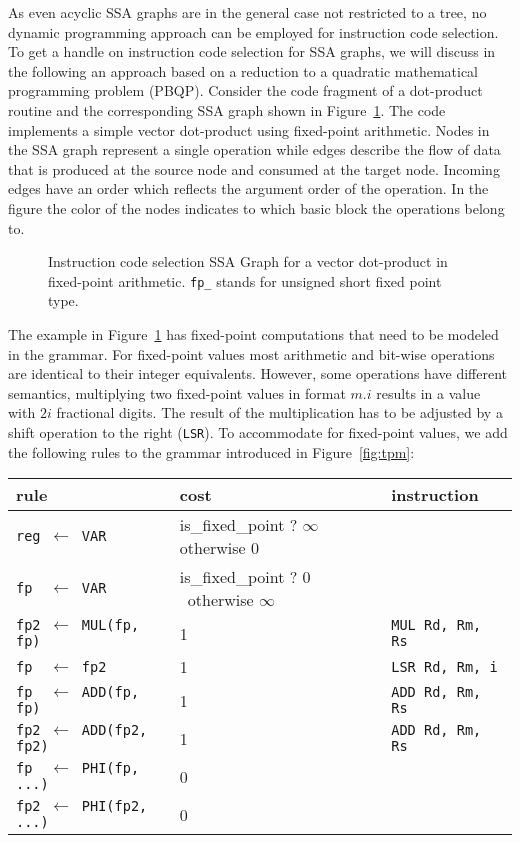 As even acyclic SSA graphs are in the general case not restricted to a tree, no dynamic programming approach
can be employed for instruction code selection.  To get a handle on instruction code
selection for SSA graphs, we will discuss in the following an approach
based on a reduction to a quadratic mathematical programming problem
(PBQP).  Consider the code fragment of a dot-product routine
and the corresponding SSA graph shown in Figure~\ref{fig:ssa_graph}.
The code implements a simple vector dot-product using fixed-point
arithmetic.  Nodes in the SSA graph represent a single
operation while edges describe the flow of data that is produced at the
source node and consumed at the target node. Incoming edges
have an order which reflects the argument order of the operation. In
the figure the color of the nodes indicates to which basic block the
operations belong to.

\begin{figure}[bh]
  \begin{center}
  \end{center}
  \caption{Instruction code selection SSA Graph for a vector dot-product in
    fixed-point arithmetic.  \texttt{fp\_} stands for unsigned short fixed point type. }\label{fig:ssa_graph}
\end{figure}

The example in Figure~\ref{fig:ssa_graph} has fixed-point computations
that need to be modeled in the grammar. For fixed-point values most
arithmetic and bit-wise operations are identical to their integer
equivalents. However, some operations have different semantics, \eg
multiplying two fixed-point values in format $m.i$ results in a value
with $2i$ fractional digits. The result of the multiplication has to
be adjusted by a shift operation to the right (\texttt{LSR}). To accommodate for
fixed-point values, we add the following rules to the grammar
introduced in Figure~\ref{fig:tpm}:
\begin{center}
\begin{tabular}{l|l|l}
  rule & cost & instruction\\ \hline
   \tt reg $\gets$ VAR & is\_fixed\_point ? \(\infty\) otherwise 0\\
   \tt fp \ $\gets$ VAR & is\_fixed\_point ? 0 \ otherwise  \(\infty\)  \\
  \tt  fp2 $\gets$ MUL(fp, fp)   & 1 & \tt   MUL Rd, Rm, Rs \\
  \tt  fp \ $\gets$ fp2           & 1 &\tt   LSR Rd, Rm, i  \\
  \tt  fp \ $\gets$ ADD(fp, fp)   & 1 & \tt   ADD Rd, Rm, Rs \\
  \tt  fp2 $\gets$ ADD(fp2, fp2) & 1 & \tt   ADD Rd, Rm, Rs \\
  \tt  fp \ $\gets$ PHI(fp, ...) & 0 \\
  \tt  fp2 $\gets$ PHI(fp2, ...) & 0 \\
\end{tabular}
\end{center}

